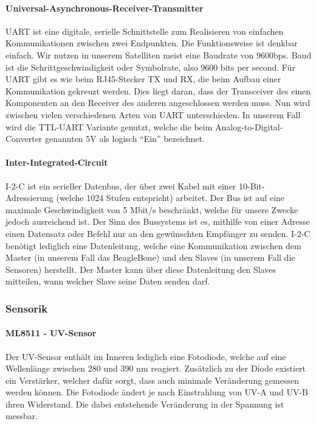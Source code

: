 \paragraph{Universal-Asynchronous-Receiver-Transmitter}
UART ist eine digitale, serielle Schnittstelle zum Realisieren von einfachen Kommunikationen zwischen zwei Endpunkten. Die Funktionsweise ist denkbar einfach. Wir nutzen in unserem Satelliten meist eine Baudrate von 9600bps. Baud ist die Schrittgeschwindigkeit oder Symbolrate, also 9600 bits per second. Für UART gibt es wie beim RJ45-Stecker TX und RX, die beim Aufbau einer Kommunikation gekreuzt werden. Dies liegt daran, dass der Transceiver des einen Komponenten an den Receiver des anderen angeschlossen werden muss. Nun wird zwischen vielen verschiedenen Arten von UART unterschieden. In unserem Fall wird die TTL-UART Variante genutzt, welche die beim Analog-to-Digital-Converter genannten 5V als logisch ``Ein'' bezeichnet. \\

\paragraph{Inter-Integrated-Circuit}
I-2-C ist ein serieller Datenbus, der über zwei Kabel mit einer 10-Bit-Adressierung (welche 1024 Stufen entspricht) arbeitet. Der Bus ist auf eine maximale Geschwindigkeit von 5 Mbit/s beschränkt, welche für unsere Zwecke jedoch ausreichend ist. Der Sinn des Bussystems ist es, mithilfe von einer Adresse einen Datensatz oder Befehl nur an den gewünschten Empfänger zu senden. I-2-C benötigt lediglich eine Datenleitung, welche eine Kommunikation zwischen dem Master (in unserem Fall das BeagleBone) und den Slaves (in unserem Fall die Sensoren) herstellt. Der Master kann über diese Datenleitung den Slaves mitteilen, wann welcher Slave seine Daten senden darf.

\subsubsection{Sensorik}
\paragraph{ML8511 - UV-Sensor}
Der UV-Sensor enthält im Inneren lediglich eine Fotodiode, welche auf eine Wellenlänge zwischen 280 und 390 nm reagiert. Zusätzlich zu der Diode existiert ein Verstärker, welcher dafür sorgt, dass auch minimale Veränderung gemessen werden können. Die Fotodiode ändert je nach Einstrahlung von UV-A und UV-B ihren Widerstand. Die dabei entstehende Veränderung in der Spannung ist messbar.

